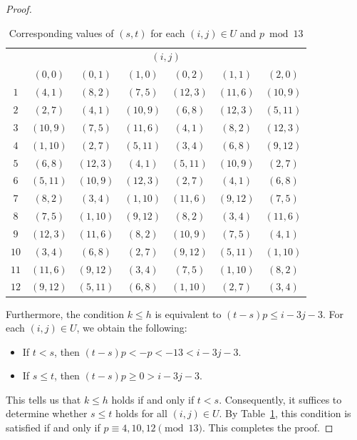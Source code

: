 \documentclass[10pt,a4paper]{amsart}
\begin{document}
\begin{proof}
\newpage
\begin{table}[tbp]\vspace{-6mm}
    \centering
    \hspace{-1mm}
    \begin{tabular}{c|cccccc}
       \multicolumn{1}{c}{} & \multicolumn{6}{c}{$(i,j)$}\\[2mm]
       & $(0,0)$ & $(0,1)$ & $(1,0)$ & $(0,2)$ & $(1,1)$ & $(2,0)$\\\hline
       $1$ & $(4,1)$ & $(8,2)$ & $(7,5)$ & $(12,3)$ & $(11,6)$ & $(10,9)$\\
       $2$ & $(2,7)$ & $(4,1)$ & $(10,9)$ & $(6,8)$ & $(12,3)$ & $(5,11)$\\
       $3$ & $(10,9)$ & $(7,5)$ & $(11,6)$ & $(4,1)$ & $(8,2)$ & $(12,3)$\\
       $4$ & $(1,10)$ & $(2,7)$ & $(5,11)$ & $(3,4)$ & $(6,8)$ & $(9,12)$\\
       $5$ & $(6,8)$ & $(12,3)$ & $(4,1)$ & $(5,11)$ & $(10,9)$ & $(2,7)$\\
       $6$ & $(5,11)$ & $(10,9)$ & $(12,3)$ & $(2,7)$ & $(4,1)$ & $(6,8)$\\
       $7$ & $(8,2)$ & $(3,4)$ & $(1,10)$ & $(11,6)$ & $(9,12)$ & $(7,5)$\\
       $8$ & $(7,5)$ & $(1,10)$ & $(9,12)$ & $(8,2)$ & $(3,4)$ & $(11,6)$\\
       $9$ & $(12,3)$ & $(11,6)$ & $(8,2)$ & $(10,9)$ & $(7,5)$ & $(4,1)$\\
       $10$ & $(3,4)$ & $(6,8)$ & $(2,7)$ & $(9,12)$ & $(5,11)$ & $(1,10)$\\
       $11$ & $(11,6)$ & $(9,12)$ & $(3,4)$ & $(7,5)$ & $(1,10)$ & $(8,2)$\\
       $12$ & $(9,12)$ & $(5,11)$ & $(6,8)$ & $(1,10)$ & $(2,7)$ & $(3,4)$
    \end{tabular}\vspace{-1mm}
    \caption{Corresponding values of $(s,t)$ for each $(i,j) \in U$ and $p \bmod{13}$}\label{tbl:st}
\end{table}

Furthermore, the condition $k \leq h$ is equivalent to $(t-s)p \leq i-3j-3$.
For each $(i,j) \in U$, we obtain the following:\vspace{-0.4mm}
\begin{itemize}
    \item If $t < s$, then $(t-s)p < -p < -13 < i-3j-3$.\vspace{-2.4mm}
    \item If $s \leq t$, then $(t-s)p \geq 0 > i-3j-3$.\vspace{0.4mm}
\end{itemize}
This tells us that $k \leq h$ holds if and only if $t < s$.
Consequently, it suffices to determine whether $s \leq t$ holds for all $(i,j) \in U$.
By Table~\ref{tbl:st}, this condition is satisfied if and only if $p \equiv 4, 10, 12 \pmod{13}$.
This completes the proof.
\end{proof}
\end{document}
